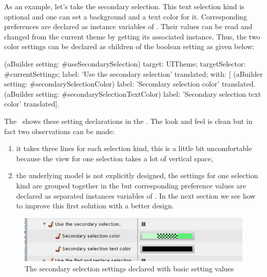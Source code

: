 \documentclass[a4paper,10pt,twoside]{book}
\begin{document}
{As an example, let's take the secondary selection. This text selection kind is optional and one can set a background and a text color for it. Corresponding preferences are declared as instance variables of . Their values can be read and changed from the current theme by getting its associated  instance. Thus, the two color settings can be declared as children of the  boolean setting as given below:
\begin{code}{}
(aBuilder setting: #useSecondarySelection)
	target: UITheme;
	targetSelector: #currentSettings;
	label: 'Use the secondary selection' translated;
	with: [
		(aBuilder setting: #secondarySelectionColor)
			label: 'Secondary selection color' translated.
		(aBuilder setting: #secondarySelectionTextColor)
			label: 'Secondary selection text color' translated].
\end{code}
The~ shows these setting declarations in the \setbrowser. The look and feel is clean but in fact two observations can be made:
\begin{enumerate}
\item it takes three lines for each selection kind, this is a little bit uncomfortable because the view for one selection takes a lot of vertical space,
\item the underlying model is not explicitly designed, the settings for one selection kind are grouped together in the \setbrowser but corresponding preference values are declared as separated instances variables of . In the next section we see how to improve this first solution with a better design.
\end{enumerate}
\begin{figure}[tbh]
\begin{center}
\includegraphics[scale=0.45]{secondarySelectionColorV1}
\caption{The secondary selection settings declared with basic setting values}
\end{center}
\end{figure}

}
\end{document}
